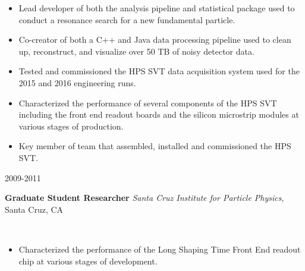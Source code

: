 \documentclass[11pt]{article}
\newcommand{\experienceentry}[5] { 
    \noindent
    \begin{minipage}[t]{0.15\textwidth} \begin{flushright} #1 \end{flushright} \end{minipage} \hspace{0.01\textwidth}
    \begin{minipage}[t]{0.84\textwidth} 
        \textbf{#2} \newline
        \emph{#3}, #4
    \end{minipage} \\[0.01pt]
    #5 \vspace{11pt}
}
\begin{document}
                        {   
            \begin{itemize}[label=\textcolor{indigodye}{$\circ$}, noitemsep, nolistsep, leftmargin=0.19\textwidth]
                \item Lead developer of both the analysis pipeline and statistical package
                      used to conduct a resonance search for a new fundamental particle.
                \item Co-creator of both a C++ and Java data processing pipeline used to 
                      clean up, reconstruct, and visualize over 50 TB of noisy detector data. 
                \item Tested and commissioned the HPS SVT data acquisition system used for the 2015 and
                      2016 engineering runs. 
                \item Characterized the performance of several components of the HPS
                      SVT including the front end readout boards and the silicon microstrip
                      modules at various stages of production.
                \item Key member of team that assembled, installed and 
                      commissioned the HPS SVT.
            \end{itemize} 
                      } 
        \experienceentry{2009-2011}
                        {Graduate Student Researcher}
                        {Santa Cruz Institute for Particle Physics}
                        {Santa Cruz, CA}
                        {
            \begin{itemize}[label=\textcolor{indigodye}{$\circ$}, noitemsep, nolistsep, leftmargin=0.19\textwidth]
                \item Characterized the performance of the Long Shaping Time Front End readout chip at
                      various stages of development.
            \end{itemize}
                        } 
\end{document}
